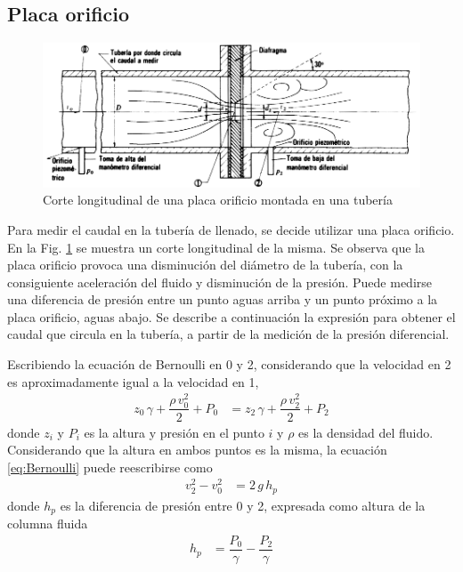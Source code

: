 \subsection{Placa orificio}
\label{subsec:PlacaOrificio}


\begin{figure}[t]
 \centering
\includegraphics[width=\textwidth]{Cap2-DisenoEnsamblado/images/placaOrif.png}
\caption{Corte longitudinal de una placa orificio montada en una tubería
\cite{bib:Mataix}}
 \label{fig:placaOrificio}
\end{figure}

Para medir el caudal en la tubería de llenado, se decide
utilizar una placa orificio.
En la Fig. \ref{fig:placaOrificio} se muestra un
corte longitudinal de la misma.
Se observa que la placa orificio provoca una disminución del diámetro
de la tubería, con la consiguiente aceleración del fluido y disminución de la
presión.
Puede medirse una diferencia de presión entre un punto aguas arriba y un punto
próximo a la placa orificio, aguas abajo.
Se describe a continuación la expresión para obtener el caudal que circula en
la tubería, a partir de la medición de la presión diferencial.

Escribiendo la ecuación de Bernoulli en 0 y 2, considerando que la velocidad en
2 es aproximadamente igual a la velocidad en 1,
\begin{align}
 z_0 \, \gamma + \dfrac{\rho \,v_0^2}{2} + P_0 &= z_2 \, \gamma + \dfrac{\rho
\,v_2^2}{2} + P_2
\label{eq:Bernoulli}
\end{align}
donde $z_i$ y $P_i$ es la altura y presión en el punto $i$ y $\rho$ es 
la densidad del fluido.
Considerando que la altura en ambos puntos es la misma, la ecuación
\eqref{eq:Bernoulli} puede reescribirse como
\begin{align}
 v_2^2 - v_0^2 &= 2\,g\,h_p
 \label{eq:Bernoulli2}
\end{align}
donde $h_p$ es la diferencia de presión entre 0 y 2, expresada como
altura de la columna fluida
\begin{align}
 h_p &= \dfrac{P_0}{\gamma}-\dfrac{P_2}{\gamma}
\end{align}

